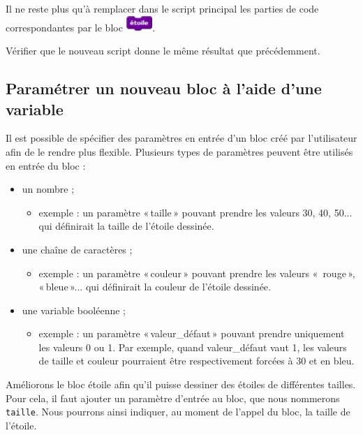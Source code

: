 Il ne reste plus qu’à remplacer dans le script principal les parties de code correspondantes par le bloc  \includegraphics[width=1cm]{./images/scratch03/fonction/Scratch_Fonctions_08}. 

Vérifier que le nouveau script donne le même résultat que précédemment.


\subsection{Paramétrer un nouveau bloc à l’aide d’une variable}

Il est possible de spécifier des paramètres en entrée d’un bloc créé par l’utilisateur afin de le rendre plus flexible. Plusieurs types de paramètres peuvent être utilisés en entrée du bloc :

\begin{itemize}
\item un nombre ;
  \begin{itemize}
   \item exemple : un paramètre «\,taille\,» pouvant prendre les valeurs 30, 40, 50... qui définirait la taille de l’étoile dessinée.
  \end{itemize}
\item une chaîne de caractères ;
  \begin{itemize}
     \item exemple : un paramètre «\,couleur\,» pouvant prendre les valeurs «\, rouge\,», «\,bleue\,»... qui définirait la couleur de l’étoile dessinée.
  \end{itemize}
\item une variable booléenne ;
  \begin{itemize}
    \item exemple : un paramètre «\,valeur\_défaut\,» pouvant prendre uniquement les valeurs 0 ou 1. Par exemple, quand valeur\_défaut vaut 1, les valeurs de taille et couleur pourraient être respectivement forcées à 30 et en bleu.
  \end{itemize}
\end{itemize}

Améliorons le bloc étoile afin qu’il puisse dessiner des étoiles de différentes tailles. Pour cela, il faut ajouter un paramètre d’entrée au bloc, que nous nommerons \texttt{taille}. Nous pourrons ainsi indiquer, au moment de l’appel du bloc, la taille de l’étoile.

